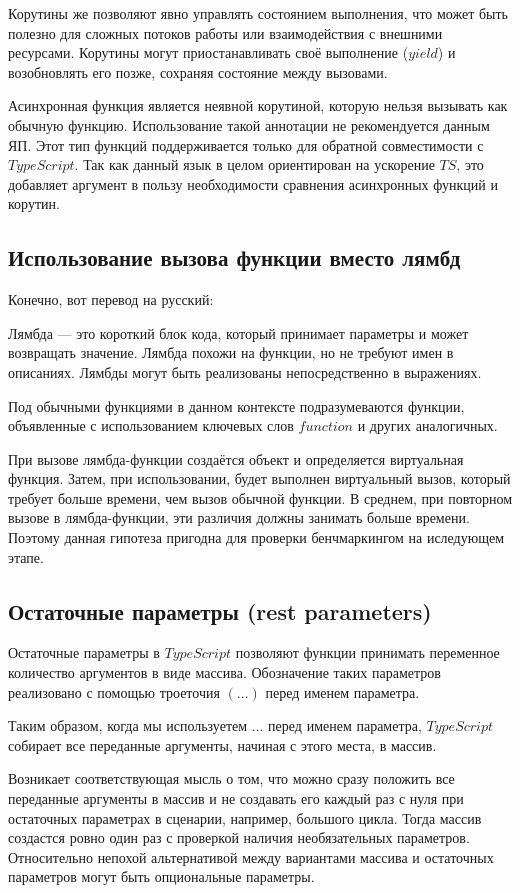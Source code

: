 \documentclass{mipt-thesis-bs}
\begin{document}
Корутины же позволяют явно управлять состоянием выполнения, что может
быть полезно для сложных потоков работы или взаимодействия
с внешними ресурсами. Корутины могут приостанавливать своё
выполнение ($yield$) и возобновлять его позже, сохраняя
состояние между вызовами.

Асинхронная функция является неявной корутиной, которую нельзя
вызывать как обычную функцию. Использование такой аннотации
не рекомендуется данным ЯП. Этот тип функций поддерживается
только для обратной совместимости с $TypeScript$.
Так как данный язык в целом ориентирован на ускорение $TS$, это
добавляет аргумент в пользу необходимости сравнения асинхронных
функций и корутин.

\subsection{Использование вызова функции вместо лямбд}

Конечно, вот перевод на русский:

Лямбда — это короткий блок кода, который принимает параметры
и может возвращать значение. Лямбда похожи на функции, но не требуют имен
в описаниях. Лямбды могут быть реализованы непосредственно в выражениях.

Под обычными функциями в данном контексте подразумеваются
функции, объявленные с использованием ключевых слов $function$
и других аналогичных.

При вызове лямбда-функции создаётся объект и определяется
виртуальная функция. Затем, при использовании, будет
выполнен виртуальный вызов, который требует больше времени,
чем вызов обычной функции. В среднем, при повторном вызове
в лямбда-функции, эти различия должны занимать больше времени.
Поэтому данная гипотеза пригодна для проверки бенчмаркингом
на иследующем этапе.

\subsection{Остаточные параметры (rest parameters)}

Остаточные параметры в $TypeScript$ позволяют функции
принимать переменное количество аргументов в виде массива.
Обозначение таких параметров реализовано с помощью троеточия $(...)$
перед именем параметра.

Таким образом, когда мы используетем $...$ перед именем параметра,
$TypeScript$ собирает все переданные аргументы, начиная с этого места, в массив.

Возникает соответствующая мысль о том, что можно сразу положить все переданные
аргументы в массив и не создавать его каждый раз с нуля при остаточных параметрах
в сценарии, например, большого цикла. Тогда массив создастся ровно один раз с проверкой
наличия необязательных параметров. Относительно непохой альтернативой между
вариантами массива и остаточных параметров могут быть опциональные параметры.
\end{document}
